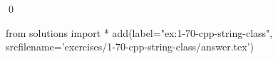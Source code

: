 
\begin{ex}
  \label{ex:1-70-cpp-string-class}
  
  \qed
\end{ex}
\begin{python0}
from solutions import *
add(label="ex:1-70-cpp-string-class",
    srcfilename='exercises/1-70-cpp-string-class/answer.tex')
\end{python0}
